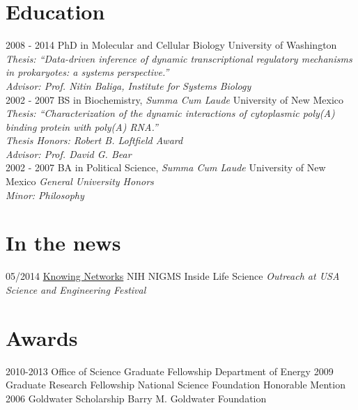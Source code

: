\documentclass[]{friggeri-cv}
\begin{document}
\section{Education}
\begin{entrylist}
  \entry
    {2008 - 2014}
    {PhD in Molecular and Cellular Biology}
    {University of Washington}
    {\emph{Thesis: ``Data-driven inference of dynamic transcriptional regulatory mechanisms in prokaryotes: a systems perspective.''}\\
    \emph{Advisor: Prof. Nitin Baliga, Institute for Systems Biology}\\}
  \entry
    {2002 - 2007}
    {BS in Biochemistry, \textit{Summa Cum Laude}}
    {University of New Mexico}
    {\emph{Thesis: ``Characterization of the dynamic interactions of cytoplasmic poly(A) binding protein with poly(A) RNA.''}\\
    \textit{Thesis Honors: Robert B. Loftfield Award}\\
    \emph{Advisor: Prof. David G. Bear}}\\
   \entry
    {2002 - 2007}
    {BA in Political Science, \textit{Summa Cum Laude}}
    {University of New Mexico}
    {\textit{General University Honors}\\
    \textit{Minor: Philosophy}
    }
\end{entrylist}

\section{In the news}
\begin{entrylist}
  \entry
    {05/2014}
    {\href{http://publications.nigms.nih.gov/insidelifescience/knowing-networks.html}{Knowing Networks}}
    {NIH NIGMS Inside Life Science}
    {\emph{Outreach at USA Science and Engineering Festival}}
\end{entrylist}

\section{Awards}
\newpage
\begin{entrylist}
  \entry
    {2010-2013}
    {Office of Science Graduate Fellowship}
    {Department of Energy}
    {}
  \entry
    {2009}
    {Graduate Research Fellowship}
    {National Science Foundation}
    {Honorable Mention}
   \entry
    {2006}
    {Goldwater Scholarship}
    {Barry M. Goldwater Foundation}
    {}
\end{entrylist}
\end{document}
